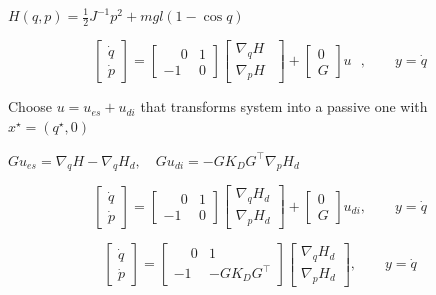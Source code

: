 \documentclass[
]{report}
\begin{document}
\begin{tcolorbox}[enhanced jigsaw, opacityback=0, breakable, leftrule=.75mm, toptitle=1mm, rightrule=.15mm, toprule=.15mm, bottomrule=.15mm, opacitybacktitle=0.6, colbacktitle=quarto-callout-note-color!10!white, colframe=quarto-callout-note-color-frame, title={System Dynamics}, bottomtitle=1mm, left=2mm, colback=white, arc=.35mm, titlerule=0mm, coltitle=black]

\(H(q,p) = \frac{1}{2} J^{-1} p^2 + mgl (1 - \cos q)\)

\[
\begin{bmatrix} \dot{q} \\ \dot{p} \end{bmatrix} = 
\begin{bmatrix} \phantom{-}0 & 1 \\ -1 & 0 \end{bmatrix} 
\begin{bmatrix} \nabla_q H_{\phantom{d}} \\ \nabla_p H_{\phantom{d}} \end{bmatrix} +
\begin{bmatrix} 0 \\ G \end{bmatrix} u_\phantom{di},
\qquad y = \dot{q}
\]

Choose \(u = u_{es} + u_{di}\) that transforms system into a passive one
with \(x^\star = (q^\star, 0)\)

\(Gu_{es} = \nabla_q H - \nabla_q H_d , \quad Gu_{di} = -GK_D G^\top \nabla_p H_d\)

\[
\begin{bmatrix} \dot{q} \\ \dot{p} \end{bmatrix} = 
\begin{bmatrix} \phantom{-}0 & 1 \\ -1 & 0 \end{bmatrix} 
\begin{bmatrix} \nabla_q H_d \\ \nabla_p H_d \end{bmatrix} +
\begin{bmatrix} 0 \\ G \end{bmatrix} u_{di},
\qquad y = \dot{q}
\]

\[
\begin{bmatrix} \dot{q} \\ \dot{p} \end{bmatrix} = 
\begin{bmatrix} \phantom{-}0 & 1 \\ -1 & -G K_D G^\top \end{bmatrix} 
\begin{bmatrix} \nabla_q H_d \\ \nabla_p H_d \end{bmatrix},
\qquad y = \dot{q}
\]

\end{tcolorbox}
\end{document}
